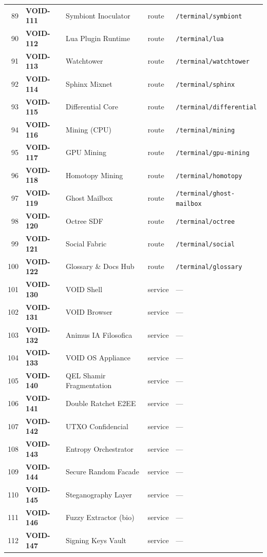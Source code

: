 \documentclass[10pt,a4paper,landscape]{article}
\begin{document}
\begin{longtable}{@{}rl p{4.2cm} p{1.4cm} p{3.8cm}@{}}
89 & \textbf{VOID-111} & Symbiont Inoculator & route & \texttt{/terminal/symbiont} \\
90 & \textbf{VOID-112} & Lua Plugin Runtime & route & \texttt{/terminal/lua} \\
91 & \textbf{VOID-113} & Watchtower & route & \texttt{/terminal/watchtower} \\
92 & \textbf{VOID-114} & Sphinx Mixnet & route & \texttt{/terminal/sphinx} \\
93 & \textbf{VOID-115} & Differential Core & route & \texttt{/terminal/differential} \\
94 & \textbf{VOID-116} & Mining (CPU) & route & \texttt{/terminal/mining} \\
95 & \textbf{VOID-117} & GPU Mining & route & \texttt{/terminal/gpu-mining} \\
96 & \textbf{VOID-118} & Homotopy Mining & route & \texttt{/terminal/homotopy} \\
97 & \textbf{VOID-119} & Ghost Mailbox & route & \texttt{/terminal/ghost-mailbox} \\
98 & \textbf{VOID-120} & Octree SDF & route & \texttt{/terminal/octree} \\
99 & \textbf{VOID-121} & Social Fabric & route & \texttt{/terminal/social} \\
100 & \textbf{VOID-122} & Glossary \& Docs Hub & route & \texttt{/terminal/glossary} \\
101 & \textbf{VOID-130} & VOID Shell & service & — \\
102 & \textbf{VOID-131} & VOID Browser & service & — \\
103 & \textbf{VOID-132} & Animus IA Filosofica & service & — \\
104 & \textbf{VOID-133} & VOID OS Appliance & service & — \\
105 & \textbf{VOID-140} & QEL Shamir Fragmentation & service & — \\
106 & \textbf{VOID-141} & Double Ratchet E2EE & service & — \\
107 & \textbf{VOID-142} & UTXO Confidencial & service & — \\
108 & \textbf{VOID-143} & Entropy Orchestrator & service & — \\
109 & \textbf{VOID-144} & Secure Random Facade & service & — \\
110 & \textbf{VOID-145} & Steganography Layer & service & — \\
111 & \textbf{VOID-146} & Fuzzy Extractor (bio) & service & — \\
112 & \textbf{VOID-147} & Signing Keys Vault & service & — \\

\end{longtable}
\end{document}
